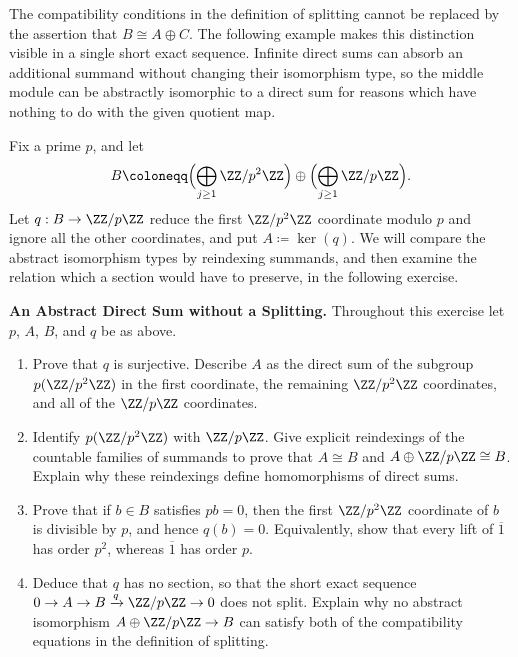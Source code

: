 \documentclass[12pt,reqno]{amsart}
\begin{document}
\hrulefill

The compatibility conditions in the definition of splitting cannot be replaced by the assertion that $B\cong A\oplus C$. The following example makes this distinction visible in a single short exact sequence. Infinite direct sums can absorb an additional summand without changing their isomorphism type, so the middle module can be abstractly isomorphic to a direct sum for reasons which have nothing to do with the given quotient map.

Fix a prime $p$, and let
\[
B\coloneqq\Bigl(\bigoplus_{j\geq1}\ZZ/p^2\ZZ\Bigr)\oplus\Bigl(\bigoplus_{j\geq1}\ZZ/p\ZZ\Bigr).
\]
Let $q:B\to\ZZ/p\ZZ$ reduce the first $\ZZ/p^2\ZZ$ coordinate modulo $p$ and ignore all the other coordinates, and put $A\coloneqq\ker(q)$. We will compare the abstract isomorphism types by reindexing summands, and then examine the relation which a section would have to preserve, in the following exercise.

\hrulefill

\begin{problems}
\item\label{p:abstractsplit} \textbf{An Abstract Direct Sum without a Splitting.} Throughout this exercise let $p$, $A$, $B$, and $q$ be as above.
\begin{enumerate}
\item Prove that $q$ is surjective. Describe $A$ as the direct sum of the subgroup $p(\ZZ/p^2\ZZ)$ in the first coordinate, the remaining $\ZZ/p^2\ZZ$ coordinates, and all of the $\ZZ/p\ZZ$ coordinates.
\item Identify $p(\ZZ/p^2\ZZ)$ with $\ZZ/p\ZZ$. Give explicit reindexings of the countable families of summands to prove that $A\cong B$ and $A\oplus\ZZ/p\ZZ\cong B$. Explain why these reindexings define homomorphisms of direct sums.
\item Prove that if $b\in B$ satisfies $pb=0$, then the first $\ZZ/p^2\ZZ$ coordinate of $b$ is divisible by $p$, and hence $q(b)=0$. Equivalently, show that every lift of $\overline1$ has order $p^2$, whereas $\overline1$ has order $p$.
\item Deduce that $q$ has no section, so that the short exact sequence $0\to A\to B\xrightarrow{q}\ZZ/p\ZZ\to0$ does not split. Explain why no abstract isomorphism $A\oplus\ZZ/p\ZZ\to B$ can satisfy both of the compatibility equations in the definition of splitting.
\end{enumerate}
\end{problems}
\end{document}
